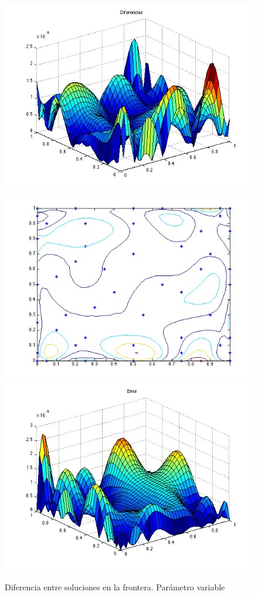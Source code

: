 \documentclass[11pt,a4paper]{article}
\begin{document}
\begin{figure}

\includegraphics[scale=.27]{diferencias2.png}
\includegraphics[scale=.27]{centros2.png}
\includegraphics[scale=.27]{error2.png}
\caption{Diferencia entre soluciones en la frontera. Parámetro variable}
\end{figure}
\end{document}
